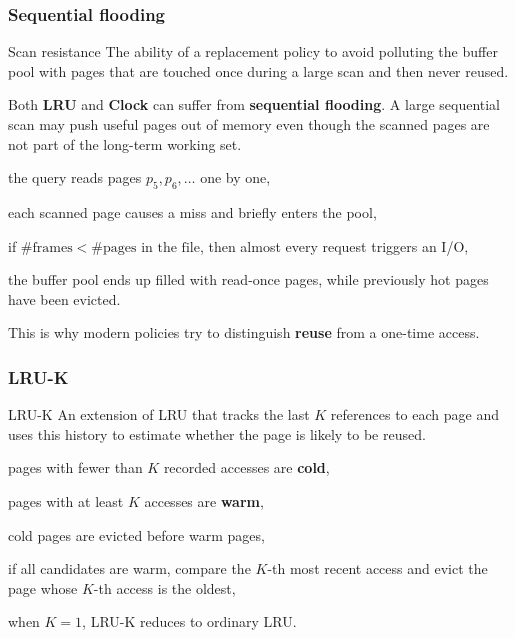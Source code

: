\documentclass[../../dis.tex]{subfiles}
\begin{document}
\subsubsection*{Sequential flooding}
\begin{concept}{Scan resistance}
The ability of a replacement policy to avoid polluting the buffer pool with pages that are touched once during a large scan and then never reused.
\end{concept}

Both \textbf{LRU} and \textbf{Clock} can suffer from \textbf{sequential flooding}. A large sequential scan may push useful pages out of memory even though the scanned pages are not part of the long-term working set.

\begin{dashlist}
    \item the query reads pages \(p_5,p_6,\dots\) one by one,
    \item each scanned page causes a miss and briefly enters the pool,
    \item if \(\#\text{frames} < \#\text{pages in the file}\), then almost every request triggers an I/O,
    \item the buffer pool ends up filled with read-once pages, while previously hot pages have been evicted.
\end{dashlist}

\begin{schema}
{}\par}
\end{schema}
\vspace*{-10px}
This is why modern policies try to distinguish \textbf{reuse} from a one-time access.

\subsubsection*{LRU-K}
\begin{concept}{LRU-K}
An extension of LRU that tracks the last \(K\) references to each page and uses this history to estimate whether the page is likely to be reused.
\end{concept}

\begin{dashlist}
    \item pages with fewer than \(K\) recorded accesses are \textbf{cold},
    \item pages with at least \(K\) accesses are \textbf{warm},
    \item cold pages are evicted before warm pages,
    \item if all candidates are warm, compare the \(K\)-th most recent access and evict the page whose \(K\)-th access is the oldest,
    \item when \(K=1\), LRU-K reduces to ordinary LRU.
\end{dashlist}
\end{document}
